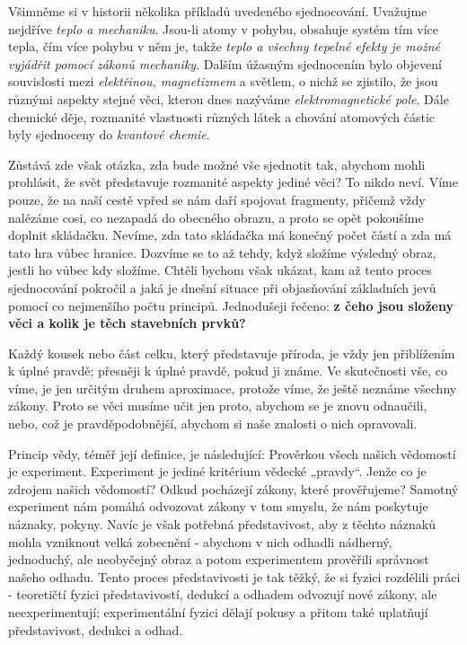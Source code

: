     Všimněme si v historii několika příkladů uvedeného sjednocování. Uvažujme nejdříve \emph{teplo 
    a mechaniku}. Jsou-li atomy v pohybu, obsahuje systém tím více tepla, čím více pohybu v něm je, 
    takže \emph{teplo a všechny tepelné efekty je možné vyjádřit pomocí zákonů mechaniky}. Dalším 
    úžasným sjednocením bylo objevení souvislosti mezi \emph{elektřinou, magnetizmem} a světlem, o 
    nichž se zjistilo, že jsou různými aspekty stejné věci, kterou dnes nazýváme 
    \emph{elektromagnetické pole}. Dále chemické děje, rozmanité vlastnosti různých látek a chování 
    atomových částic byly sjednoceny do \emph{kvantové chemie}.
    
    Zůstává zde však otázka, zda bude možné vše sjednotit tak, abychom mohli prohlásit, že svět 
    představuje rozmanité aspekty jediné věci? To nikdo neví. Víme pouze, že na naší cestě vpřed se 
    nám daří spojovat fragmenty, přičemž vždy nalézáme cosi, co nezapadá do obecného obrazu, a 
    proto se opět pokoušíme doplnit skládačku. Nevíme, zda tato skládačka má konečný počet částí a 
    zda má tato hra vůbec hranice. Dozvíme se to až tehdy, když složíme výsledný obraz, jestli ho 
    vůbec kdy složíme. Chtěli bychom však ukázat, kam až tento proces sjednocování pokročil a jaká 
    je dnešní situace při objasňování základních jevů pomocí co nejmenšího počtu principů. 
    Jednodušeji řečeno: \textbf{z čeho jsou složeny věci a kolik je těch stavebních prvků?} 
    \cite[s.~27]{Feynman02}    


    Každý kousek nebo část celku, který představuje příroda, je vždy jen přiblížením k úplné pravdě;
    přesněji k úplné pravdě, pokud ji známe. Ve skutečnosti vše, co víme, je jen určitým druhem
    aproximace, protože víme, že ještě neznáme všechny zákony. Proto se věci musíme učit jen proto,
    abychom se je znovu odnaučili, nebo, což je pravděpodobnější, abychom si naše znalosti o nich
    opravovali.
    
    Princip vědy, téměř její definice, je následující: Prověrkou všech našich vědomostí je 
    experiment. Experiment je jediné kritérium vědecké „pravdy“. Jenže co je zdrojem našich 
    vědomostí? Odkud pocházejí zákony, které prověřujeme? Samotný experiment nám pomáhá odvozovat 
    zákony v tom smyslu, že nám poskytuje náznaky, pokyny. Navíc je však potřebná představivost, 
    aby z těchto náznaků mohla vzniknout velká zobecnění - abychom v nich odhadli nádherný, 
    jednoduchý, ale neobyčejný obraz a potom experimentem prověřili správnost našeho odhadu. Tento
    proces představivosti je tak těžký, že si fyzici rozdělili práci - teoretičtí fyzici 
    představivostí, dedukcí a odhadem odvozují nové zákony, ale neexperimentují; experimentální 
    fyzici dělají pokusy a přitom také uplatňují představivost, dedukci a odhad.
    
